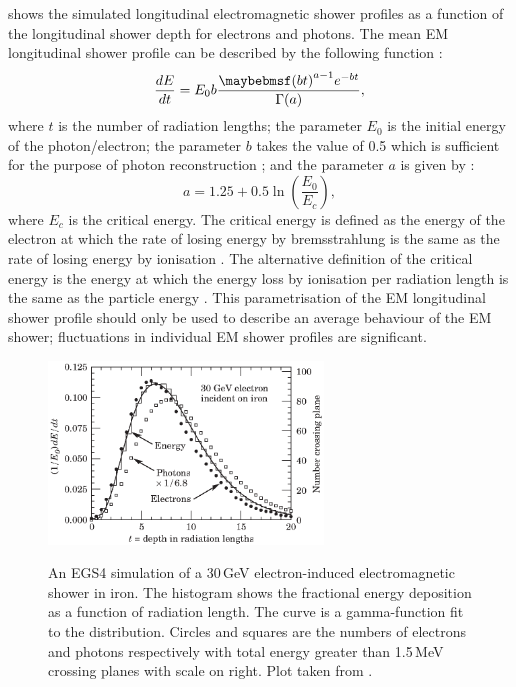  shows the simulated longitudinal electromagnetic shower profiles as a function of the longitudinal shower depth for electrons and photons. The mean EM longitudinal shower profile can be described by the following function \cite{Longo:1975wb}:
\begin{equation}
\frac{dE}{dt} = E_0 b \frac{\parenths{bt}^{a-1}e^{-bt}}{\Gamma(a)},
\label{eq:photonEMshower}
\end{equation}
where $t$ is the number of radiation lengths; the parameter $E_0$ is the initial energy of the photon/electron; the parameter $b$ takes the value of 0.5 which is sufficient for the purpose of photon reconstruction \cite{Agashe:2014kda}; and the parameter $a$ is given by \cite{Thomson:2009rp}:
\begin{equation}
a = 1.25 + 0.5\ln\left(\frac{E_0}{E_c}\right),
\end{equation}
where $E_c$ is the critical energy. The critical energy is defined as the energy of the electron at which the rate of losing energy by bremsstrahlung is the same as the rate of losing energy by ionisation \cite{1964NASSP3012.....B}. The alternative definition of the critical energy is the energy at which the energy loss by ionisation per radiation length is the same as the particle energy \cite{rossi1952high}. This parametrisation of the EM longitudinal shower profile should only be used to describe an average behaviour of the EM shower; fluctuations in individual EM shower profiles are significant.



\begin{figure}[tbph]
\centering
{\includegraphics[width=0.65\textwidth]{photon/EMlong}}
\caption[Simulated longitudinal electromagnetic shower profile as a function of depth for electrons and photons.]
{An EGS4 \cite{Ford:1978jp,Hirayama:296198} simulation of a 30\,GeV electron-induced electromagnetic shower in iron. The histogram shows the fractional energy deposition as a function of radiation length. The curve is a gamma-function fit to the distribution. Circles and squares are the numbers of electrons and photons respectively with total energy greater than 1.5\,MeV crossing planes with scale on right. Plot taken from \cite{Agashe:2014kda}.}
\label{fig:photonEMlongProfile}
\end{figure}

